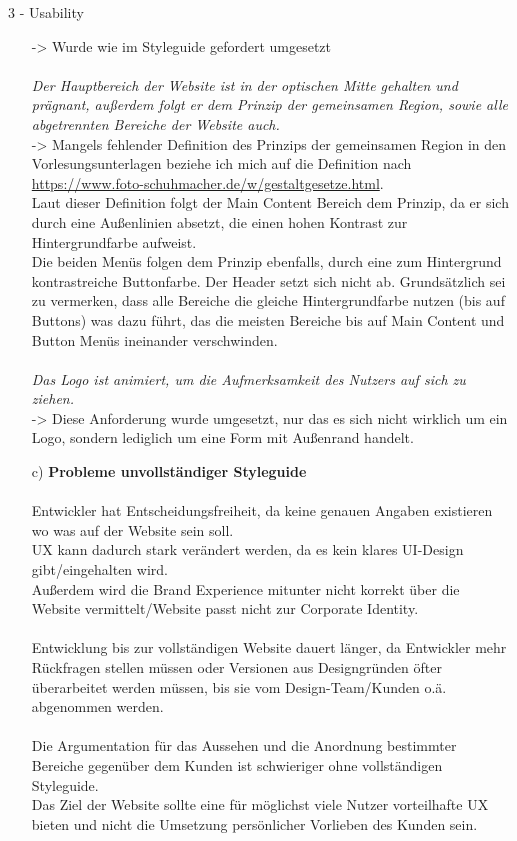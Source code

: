 \documentclass[a4paper]{article}
\begin{document}
\begin{exercise}{3 - Usability}
\begin{itemize}
-> Wurde wie im Styleguide gefordert umgesetzt\\\\
\textit{Der Hauptbereich der Website ist in der optischen Mitte gehalten und prägnant, außerdem folgt er dem Prinzip der gemeinsamen Region, sowie alle abgetrennten Bereiche der Website auch. }\\
-> Mangels fehlender Definition des Prinzips der gemeinsamen Region in den Vorlesungsunterlagen beziehe ich mich auf die Definition nach \url{https://www.foto-schuhmacher.de/w/gestaltgesetze.html}.\\ Laut dieser Definition folgt der Main Content Bereich dem Prinzip, da er sich durch eine Außenlinien absetzt, die einen hohen Kontrast zur Hintergrundfarbe aufweist.\\
Die beiden Menüs folgen dem Prinzip ebenfalls, durch eine zum Hintergrund kontrastreiche Buttonfarbe. Der Header setzt sich nicht ab. Grundsätzlich sei zu vermerken, dass alle Bereiche die gleiche Hintergrundfarbe nutzen (bis auf Buttons) was dazu führt, das die meisten Bereiche bis auf Main Content und Button Menüs ineinander verschwinden.\\\\
\textit{Das Logo ist animiert, um die Aufmerksamkeit des Nutzers auf sich zu ziehen. }\\
-> Diese Anforderung wurde umgesetzt, nur das es sich nicht wirklich um ein Logo, sondern lediglich um eine Form mit Außenrand handelt.

\item[c)]\textbf{Probleme unvollständiger Styleguide}\\\\
Entwickler hat Entscheidungsfreiheit, da keine genauen Angaben existieren wo was auf der Website sein soll.\\
UX kann dadurch stark verändert werden, da es kein klares UI-Design gibt/eingehalten wird. \\
Außerdem wird die Brand Experience mitunter nicht korrekt über die Website vermittelt/Website passt nicht zur Corporate Identity.\\\\
Entwicklung bis zur vollständigen Website dauert länger, da Entwickler mehr Rückfragen stellen müssen oder Versionen aus Designgründen öfter überarbeitet werden müssen, bis sie vom Design-Team/Kunden o.ä. abgenommen werden.\\\\
Die Argumentation für das Aussehen und die Anordnung bestimmter Bereiche gegenüber dem Kunden ist schwieriger ohne vollständigen Styleguide.\\
Das Ziel der Website sollte eine für möglichst viele Nutzer vorteilhafte UX bieten und nicht die Umsetzung persönlicher Vorlieben des Kunden sein.
\end{itemize}
\end{exercise}
\end{document}
